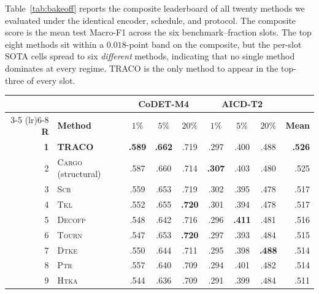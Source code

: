 ﻿\documentclass[11pt]{article}
\newcommand{\method}{\textsc{TRACO}\xspace}
\begin{document}
Table~\ref{tab:bakeoff} reports the composite leaderboard of all
twenty methods we evaluated under the identical encoder, schedule,
and protocol. The composite score is the mean test Macro-F1 across
the six benchmark--fraction slots. The top eight methods sit within
a $0.018$-point band on the composite, but the per-slot SOTA cells
spread to six \emph{different} methods, indicating that no single
method dominates at every regime. \method is the only method to
appear in the top-three of every slot.

\begin{table}[t]
\centering
\small
\setlength{\tabcolsep}{4pt}
\begin{tabular}{r l ccc ccc r}
\toprule
& & \multicolumn{3}{c}{\textbf{CoDET-M4}} & \multicolumn{3}{c}{\textbf{AICD-T2}} & \\
\cmidrule(lr){3-5} \cmidrule(lr){6-8}
\textbf{R} & \textbf{Method} & $1\%$ & $5\%$ & $20\%$ & $1\%$ & $5\%$ & $20\%$ & \textbf{Mean} \\
\midrule
\textbf{1} & \textbf{\method}         & \textbf{.589} & \textbf{.662} & .719          & .297          & .400          & .488          & \textbf{.526} \\
2  & \textsc{Cargo} (structural) & .587          & .660          & .714          & \textbf{.307} & .403          & .480          & .525 \\
3  & \textsc{Scr}                & .559          & .653          & .719          & .302          & .395          & .478          & .517 \\
4  & \textsc{Tkl}                & .552          & .655          & \textbf{.720} & .301          & .394          & .478          & .517 \\
5  & \textsc{Decofp}             & .548          & .642          & .716          & .296          & \textbf{.411} & .481          & .516 \\
6  & \textsc{Tourn}              & .547          & .653          & \textbf{.720} & .297          & .393          & .484          & .515 \\
7  & \textsc{Dtke}               & .550          & .644          & .711          & .295          & .398          & \textbf{.488} & .514 \\
8  & \textsc{Ptr}                & .557          & .640          & .709          & .294          & .401          & .482          & .514 \\
9  & \textsc{Htka}               & .544          & .636          & .709          & .291          & .399          & .484          & .511 \\

\end{tabular}
\end{table}
\end{document}
